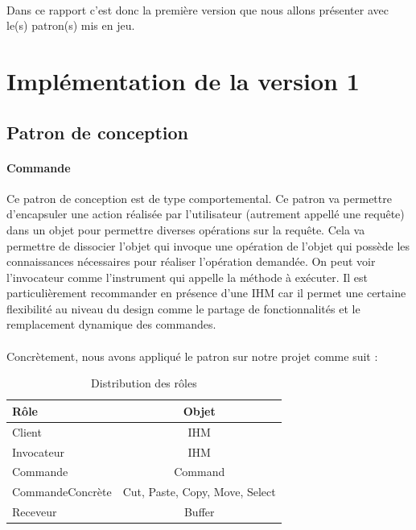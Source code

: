 \documentclass[a4paper,11pt]{article}
\begin{document}
\paragraph{}
Dans ce rapport c'est donc la première version que nous allons présenter avec le(s) patron(s) mis en jeu.

\section{Implémentation de la version 1}


\subsection{Patron de conception}

\paragraph{Commande} Ce patron de conception est de type comportemental. Ce patron va permettre d'encapsuler une action réalisée par l'utilisateur (autrement appellé une requête)  dans un objet pour permettre diverses opérations sur la requête. Cela va permettre de dissocier l'objet qui invoque une opération de l'objet qui possède les connaissances nécessaires pour réaliser l'opération demandée. On peut voir l'invocateur comme l'instrument qui appelle la méthode à exécuter. Il est particulièrement recommander en présence d'une IHM car il permet une certaine flexibilité au niveau du design comme le partage de fonctionnalités et le remplacement dynamique des commandes.
\paragraph{}
Concrètement, nous avons appliqué le patron sur notre projet comme suit : \\

\begin{table}[H]
\caption{Distribution des rôles}
\center
\begin{tabular}{||l|c||}
\hline
\textbf{Rôle} & \textbf{Objet}\\
\hline\hline
Client & IHM \\
\hline
Invocateur & IHM \\
\hline
Commande & Command \\
\hline
CommandeConcrète & Cut, Paste, Copy, Move,  Select \\
\hline
Receveur & Buffer \\
\hline
\end{tabular}
\end{table}
\end{document}
